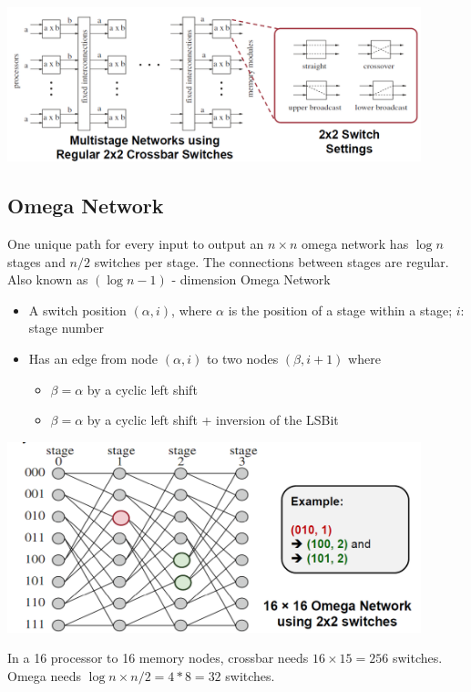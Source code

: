 \documentclass{article}
\begin{document}
\includegraphics[width=0.9\textwidth]{l10_multistage_switching_network.png}

\subsection{Omega Network}

One unique path for every input to output
an $n \times n$ omega network has $\log n$ stages and $n/2$ switches per stage.
The connections between stages are regular. Also known as $\left( \log n - 1\right)$ - dimension Omega Network
\begin{itemize}
    \item A switch position $\left(\alpha , i\right)$, where $\alpha$ is the position of a stage within a stage; $i$: stage number
    \item Has an edge from node $\left(\alpha , i\right)$ to two nodes $\left(\beta, i + 1\right)$ where
          \begin{itemize}
              \item $\beta = \alpha$ by a cyclic left shift
              \item $\beta = \alpha$ by a cyclic left shift + inversion of the LSBit
          \end{itemize}
\end{itemize}

\includegraphics[width=0.9\textwidth]{l10_omega_network.png}

In a 16 processor to 16  memory nodes, crossbar needs $16 \times 15 = 256$ switches.
Omega needs $\log n \times n/2 = 4 * 8 = 32$ switches.
\end{document}
